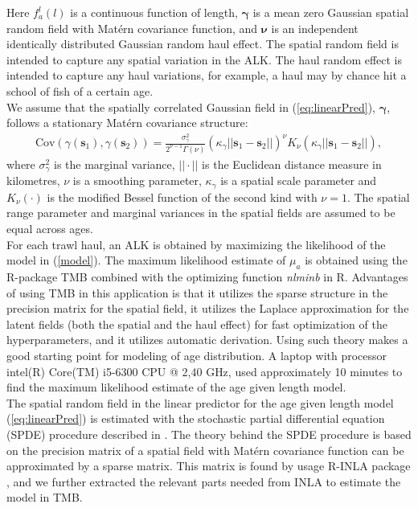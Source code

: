 \documentclass[a4paper 12pt]{article}
\numberwithin{equation}{section}
\begin{document}
Here $ f_a^l(l)$ is a continuous function of length, $\pmb{\gamma}$ is a mean zero Gaussian spatial random field with Mat\'{e}rn covariance function, and $\pmb{\nu}$ is an independent identically distributed Gaussian random haul effect. The spatial random field is intended to capture any spatial variation in the ALK. The haul random effect is intended to capture any haul variations, for example, a haul may by chance hit a school of fish of a certain age.\\  
\indent We assume that the spatially correlated Gaussian field in (\ref{eq:linearPred}), $\pmb{\gamma}$, follows a stationary Mat\'{e}rn covariance structure:
\begin{align}\label{eq:matern}
 \text{Cov}(\gamma(\mathbf{s}_1),\gamma(\mathbf{s}_2)) = \frac{\sigma^2_{\gamma}}{2^{\nu-1}\Gamma(\nu)}(\kappa_{\gamma}||\mathbf{s}_1 -\mathbf{s}_2||)^{\nu}K_{\nu}(\kappa_{\gamma}||\mathbf{s}_1-\mathbf{s}_2||),
\end{align}
where $\sigma^2_{\gamma}$ is the marginal variance, $||\cdot||$ is the Euclidean distance measure in kilometres, $\nu$ is a smoothing parameter, $\kappa_{\gamma}$ is a spatial scale parameter and $K_{\nu}(\cdot)$ is the modified Bessel function of the second kind with $\nu = 1$. The spatial range parameter and marginal variances in the spatial fields are assumed to be equal across ages.\\
\indent For each trawl haul, an ALK is obtained by maximizing the likelihood of the model in (\ref{model}). The maximum likelihood estimate of ${\mu}_{a}$  is obtained using the R-package TMB \citep{kristensen2015tmb} combined with the optimizing function \textit{nlminb} in R. Advantages of using TMB in this application is that it utilizes the sparse structure in the precision matrix for the spatial field, it utilizes the Laplace approximation for the latent fields (both the spatial and the haul effect) for fast optimization of the hyperparameters, and it utilizes automatic derivation.  Using such theory makes a good starting point for modeling of age distribution.  A laptop with  processor intel(R) Core(TM) i5-6300 CPU @ 2,40 GHz, used approximately 10 minutes to find the maximum likelihood estimate of the age given length model. \\
\indent The spatial random field in the linear predictor for the age given length model (\ref{eq:linearPred}) is estimated with the stochastic partial differential equation (SPDE) procedure described in \citep{lindgren2011explicit}. The theory behind the SPDE procedure is based on the precision matrix of a spatial field with Mat\'{e}rn  covariance function can be approximated by a sparse matrix. This matrix is found by usage R-INLA package \citep{rue2009approximate}, and we further extracted the relevant parts needed from INLA to estimate the model in TMB.
\end{document}
